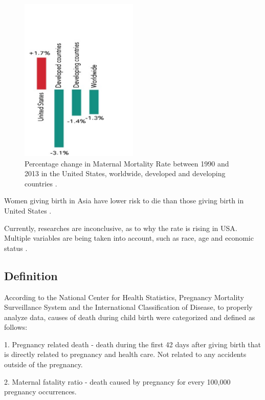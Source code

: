 \documentclass[sigconf]{acmart}
\begin{document}
\begin{figure}
  \centering
  \includegraphics[width=0.5\textwidth]{images/figure2.pdf}
  \caption{Percentage change in Maternal Mortality Rate between 1990 and 2013 in the United States, worldwide, developed and developing countries \cite{kassebaum2016global}.} \label{fig:figure2} 
\end{figure}

Women giving birth in Asia have lower risk to die than those giving birth in United States \cite{world2012trends}.

Currently, researches are inconclusive, as to why the rate is rising in USA. Multiple variables are being taken into account, such as race, age and economic status \cite{creanga2012race}.

\subsection{Definition}

According to the National Center for Health Statistics, Pregnancy Mortality Surveillance System and the International Classification of Disease, to properly analyze data, causes of death during child birth were categorized and defined \cite{callaghan2012overview} as follows:


1. Pregnancy related death - death during the first 42 days after giving birth that is directly related to pregnancy and health care. Not related to any accidents outside of the pregnancy.
   


2. Maternal fatality ratio - death caused by pregnancy for every 100,000 pregnancy occurrences.
\end{document}
